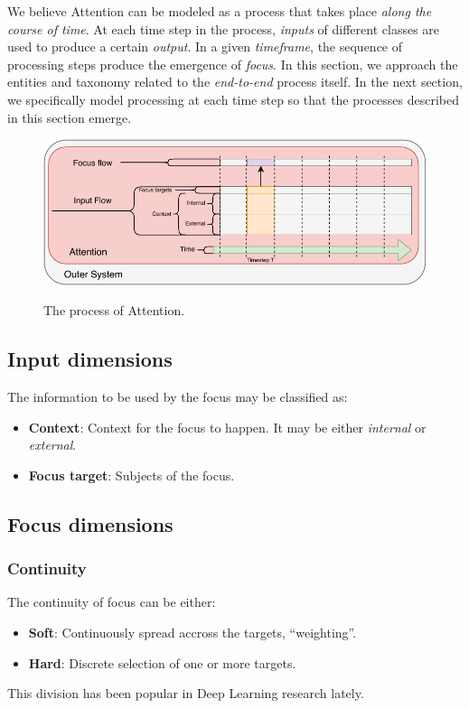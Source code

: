 \documentclass[11pt]{article}
\begin{document}
We believe Attention can be modeled as a process that takes place \emph{along the course of time}.
At each time step in the process, \emph{inputs} of different classes are used to produce a certain \emph{output}.
In a given \emph{timeframe}, the sequence of processing steps produce the emergence of \emph{focus}.
In this section, we approach the entities and taxonomy related to the \emph{end-to-end} process itself.
In the next section, we specifically model processing at each time step so that the processes described in this section emerge.

\begin{figure}[H]
    \centering
    \includegraphics[width=1.0\linewidth]{./img/att_flow.pdf}\label{fig:attflow}
    \caption{The process of Attention.}
\end{figure}

\subsection{Input dimensions}
The information to be used by the focus may be classified as:
\begin{itemize}
    \item \textbf{Context}: Context for the focus to happen. It may be either \emph{internal} or \emph{external}.
    \item \textbf{Focus target}: Subjects of the focus.
\end{itemize}

\subsection{Focus dimensions}
\subsubsection{Continuity}
The continuity of focus can be either:
\begin{itemize}
    \item \textbf{Soft}: Continuously spread accross the targets, ``weighting''.
    \item \textbf{Hard}: Discrete selection of one or more targets.
\end{itemize}
This division has been popular in Deep Learning research lately.
\end{document}
